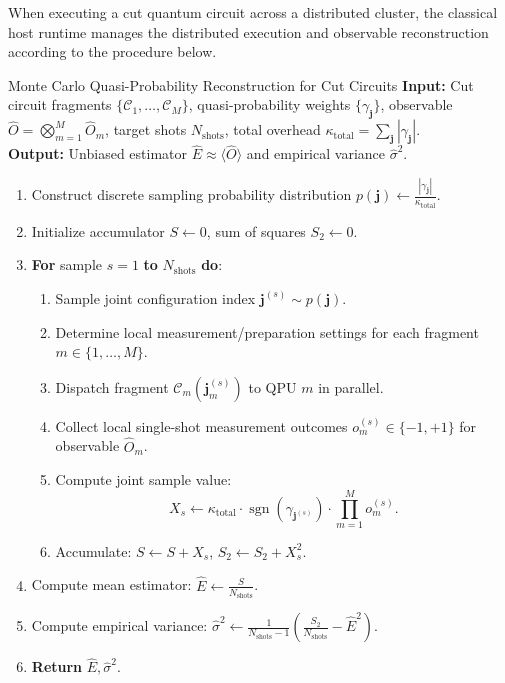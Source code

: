 When executing a cut quantum circuit across a distributed cluster, the classical host runtime manages the distributed execution and observable reconstruction according to the procedure below.

\begin{algorithmbox}{Monte Carlo Quasi-Probability Reconstruction for Cut Circuits}
\textbf{Input:} Cut circuit fragments $\{\mathcal{C}_1, \dots, \mathcal{C}_M\}$, quasi-probability weights $\{\gamma_{\bm{j}}\}$, observable $\hat{O} = \bigotimes_{m=1}^M \hat{O}_m$, target shots $N_{\text{shots}}$, total overhead $\kappa_{\text{total}} = \sum_{\bm{j}} |\gamma_{\bm{j}}|$.\\
\textbf{Output:} Unbiased estimator $\hat{E} \approx \langle \hat{O} \rangle$ and empirical variance $\hat{\sigma}^2$.
\begin{enumerate}
    \item Construct discrete sampling probability distribution $p(\bm{j}) \gets \frac{|\gamma_{\bm{j}}|}{\kappa_{\text{total}}}$.
    \item Initialize accumulator $S \gets 0$, sum of squares $S_2 \gets 0$.
    \item \textbf{For} sample $s = 1$ \textbf{to} $N_{\text{shots}}$ \textbf{do}:
    \begin{enumerate}
        \item Sample joint configuration index $\bm{j}^{(s)} \sim p(\bm{j})$.
        \item Determine local measurement/preparation settings for each fragment $m \in \{1, \dots, M\}$.
        \item Dispatch fragment $\mathcal{C}_m(\bm{j}_m^{(s)})$ to QPU $m$ in parallel.
        \item Collect local single-shot measurement outcomes $o_m^{(s)} \in \{-1, +1\}$ for observable $\hat{O}_m$.
        \item Compute joint sample value:
        \[
        X_s \gets \kappa_{\text{total}} \cdot \operatorname{sgn}\left(\gamma_{\bm{j}^{(s)}}\right) \cdot \prod_{m=1}^M o_m^{(s)}.
        \]
        \item Accumulate: $S \gets S + X_s$, \quad $S_2 \gets S_2 + X_s^2$.
    \end{enumerate}
    \item Compute mean estimator: $\hat{E} \gets \frac{S}{N_{\text{shots}}}$.
    \item Compute empirical variance: $\hat{\sigma}^2 \gets \frac{1}{N_{\text{shots}}-1}\left( \frac{S_2}{N_{\text{shots}}} - \hat{E}^2 \right)$.
    \item \textbf{Return} $\hat{E}, \hat{\sigma}^2$.
\end{enumerate}
\end{algorithmbox}

